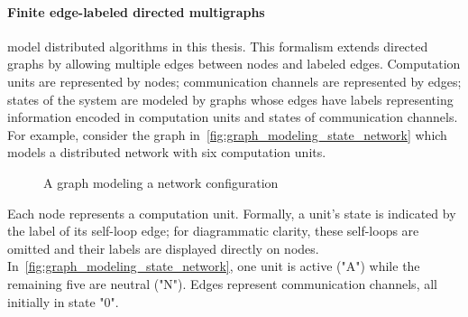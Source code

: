 \paragraph{Finite edge-labeled directed multigraphs} model distributed algorithms in this thesis. This formalism extends directed graphs by allowing multiple edges between nodes and labeled edges. Computation units are represented by nodes; communication channels are represented by edges; states of the system are modeled by graphs whose edges have labels representing information encoded in computation units and states of communication channels. For example, consider the graph in~\autoref{fig:graph_modeling_state_network} which models a distributed network with six computation units.
 \begin{figure}[!htbp]
        \centering
    \caption{A graph modeling a network configuration}
    \label{fig:graph_modeling_state_network}
\end{figure}
Each node represents a computation unit.
Formally, a unit's state is indicated by the label of its self-loop edge; for diagrammatic clarity, these self-loops are omitted and their labels are displayed directly on nodes.  
 In~\autoref{fig:graph_modeling_state_network}, one unit is active ("A") while the remaining five are neutral ("N"). Edges represent communication channels, all initially in state "0".

